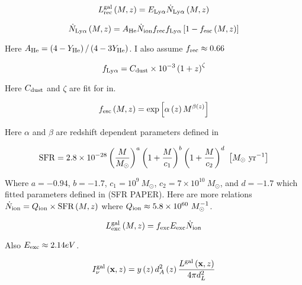 \begin{equation}
  L_{\rm rec}^{\rm gal} \left( M, z\right) = E_{\rm Ly\alpha} \dot{N}_{\rm Ly\alpha} \left( M, z\right)
\end{equation}

\begin{equation}
  \dot{N}_{\rm Ly\alpha} \left( M, z\right) = A_{\rm He} \dot{N}_{\rm ion} f_{\rm rec} f_{\rm Ly\alpha} \left[ 1 - f_{\rm esc} \left( M, z\right) \right]
\end{equation}

Here $A_{\rm He} = \left(4 - Y_{\rm He} \right) / \left( 4 - 3 Y_{\rm He} \right)$. I also assume $f_{\rm rec} \approx 0.66$

\begin{equation}
f_{\rm Ly\alpha} = C_{\rm dust} \times 10^{-3} \left( 1 + z\right)^{\zeta}
\end{equation}

Here $C_{\rm dust}$ and $\zeta$ are fit for in.

\begin{equation}
f_{\rm esc} \left( M, z\right) = \exp \left[ \alpha \left(z \right) M^{\beta \left(z \right)} \right]
\end{equation}

Here $\alpha$ and $\beta$ are redshift dependent parameters defined in

\begin{equation}
  {\rm SFR} = 2.8 \times 10^{-28} \left(\frac{M}{M_{\odot}} \right)^a \left( 1 + \frac{M}{c_1}\right)^b \left(1 + \frac{M}{c_2} \right)^d \ \left[ M_{\odot} \ {\rm yr}^{-1} \right]
\end{equation}

Where $a = -0.94$, $b = -1.7$, $c_1 = 10^9 \ M_{\odot}$, $c_2 = 7 \times 10^{10} \ M_{\odot}$, and $d = -1.7$ which
fitted parameters defined in (SFR PAPER). Here are more relations $\dot{N}_{\rm ion} = Q_{\rm ion} \times \textrm{SFR} \left(M, z \right)$ where $Q_{\rm ion} \approx 5.8 \times 10^{60} \ M_{\odot}^{-1}$.

\begin{equation}
  L_{\rm exc}^{\rm gal} \left( M, z\right) = f_{\rm exc} E_{\rm exc} \dot{N}_{\rm ion}
\end{equation}

Also $E_{\rm exc} \approx 2.14 eV$.

\begin{equation}
  I_{\nu}^{\rm gal}\left(\textbf{x}, z \right) = y \left(z \right)d_A^2 \left(z \right) \frac{L^{\rm gal} \left(\textbf{x}, z \right)}{4 \pi d_L^2}
\end{equation}

